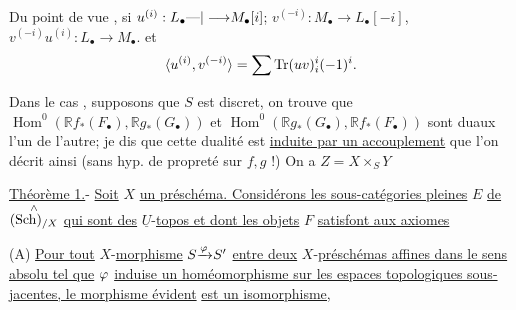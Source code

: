 Du point de vue , si $u^{(i)}:L_\bullet{\text{---}|\longrightarrow}M_\bullet[i]$;
$v^{(-i)}:M_\bullet\longrightarrow L_\bullet[-i]$, 
$v^{(-i)}u^{(i)}:L_\bullet\longrightarrow M_\bullet$.
et
\[
\langle u^{(i)},v^{(-i)}\rangle=\sum\operatorname{Tr}(uv)_{{i}}^{{i}}(-1)^{{i}}.
\]

Dans le cas ,  supposons que $S$ est discret,
 on trouve
que $\operatorname{Hom}^{0}(\mathbb{R}f_*(F_\bullet),\mathbb{R}g_*(G_\bullet))$ et
$\operatorname{Hom}^{0}(\mathbb{R}g_*(G_\bullet),\mathbb{R}f_*(F_\bullet))$
sont duaux l'un de l'autre; je dis que cette dualité est \uline{induite par un accouplement}
que l'on décrit ainsi (sans hyp. de propreté sur $f,g$ !) On a $Z=X\times_S Y$

\uline{Théorème 1.}- \uline{Soit} $X$ \uline{un préschéma. Considérons les sous-catégories pleines} $E$ \uline{de} $\overset{{\wedge}}{(\mathrm{Sch})_{/X}}$ \uline{qui sont des} $\underline{U}$-\uline{topos et dont les objets} $F$ \uline{satisfont aux axiomes}

(A) \uline{Pour tout} $X$-\uline{morphisme} $S{\xrightarrow{\varphi}}S'$ \uline{entre deux} $X$-\uline{préschémas affines dans le sens absolu tel que} ${\varphi}$ \uline{induise un homéomorphisme sur les espaces topologiques sous-jacentes, le morphisme évident}
\uline{est un isomorphisme,}

